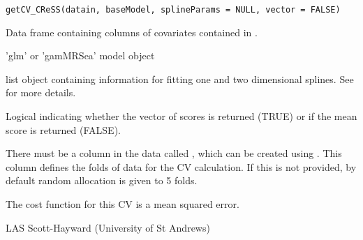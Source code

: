 \documentclass[a4paper]{book}
\begin{document}
%
\begin{Usage}
\begin{verbatim}
getCV_CReSS(datain, baseModel, splineParams = NULL, vector = FALSE)
\end{verbatim}
\end{Usage}
%
\begin{Arguments}
\begin{ldescription}
\item[\code{datain}] Data frame containing columns of covariates contained in .

\item[\code{baseModel}] 'glm' or 'gamMRSea' model object

\item[\code{splineParams}] list object containing information for fitting one and two dimensional splines. See  for more details.

\item[\code{vector}] Logical indicating whether the vector of scores is returned (TRUE) or if the mean score is returned (FALSE).
\end{ldescription}
\end{Arguments}
%
\begin{Details}\relax
There must be a column in the data called , which can be created using .  This column defines the folds of data for the CV calculation.  If this is not provided, by default random allocation is given to 5 folds.

The cost function for this CV is a mean squared error.
\end{Details}
%
\begin{Author}\relax
LAS Scott-Hayward (University of St Andrews)
\end{Author}
%
\begin{Examples}
\end{Examples}
\end{document}
